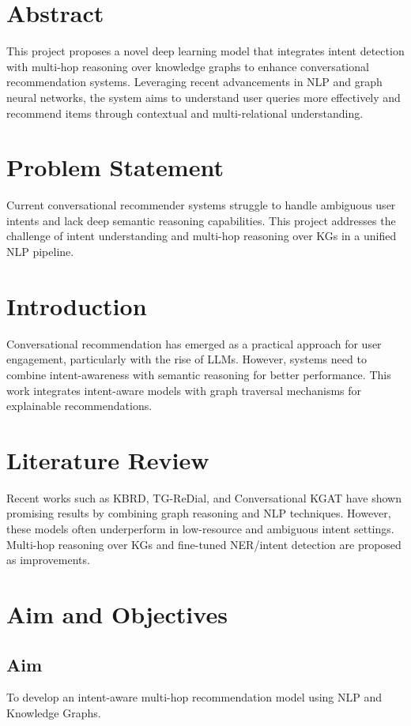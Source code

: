 \documentclass[12pt]{article}
\begin{document}
\tableofcontents
\newpage

\section{Abstract}
This project proposes a novel deep learning model that integrates intent detection with multi-hop reasoning over knowledge graphs to enhance conversational recommendation systems. Leveraging recent advancements in NLP and graph neural networks, the system aims to understand user queries more effectively and recommend items through contextual and multi-relational understanding.

\section{Problem Statement}
Current conversational recommender systems struggle to handle ambiguous user intents and lack deep semantic reasoning capabilities. This project addresses the challenge of intent understanding and multi-hop reasoning over KGs in a unified NLP pipeline.

\section{Introduction}
Conversational recommendation has emerged as a practical approach for user engagement, particularly with the rise of LLMs. However, systems need to combine intent-awareness with semantic reasoning for better performance. This work integrates intent-aware models with graph traversal mechanisms for explainable recommendations.

\section{Literature Review}
Recent works such as KBRD, TG-ReDial, and Conversational KGAT have shown promising results by combining graph reasoning and NLP techniques. However, these models often underperform in low-resource and ambiguous intent settings. Multi-hop reasoning over KGs and fine-tuned NER/intent detection are proposed as improvements.

\section{Aim and Objectives}
\subsection{Aim}
To develop an intent-aware multi-hop recommendation model using NLP and Knowledge Graphs.
\end{document}
